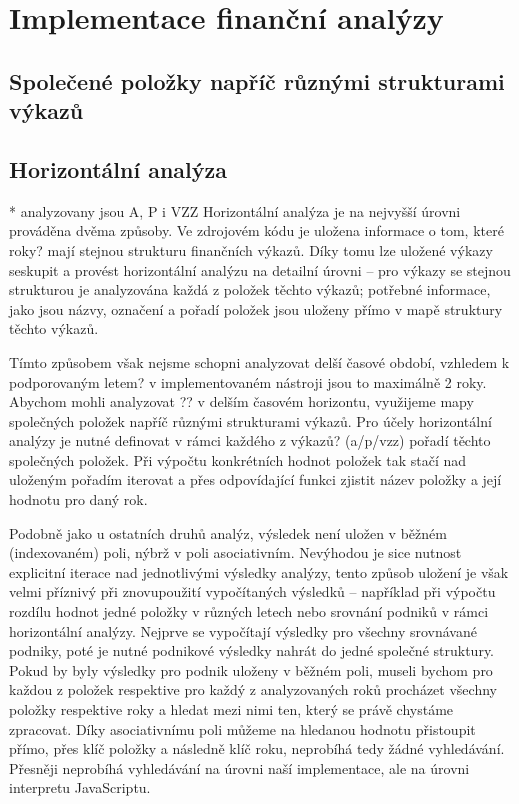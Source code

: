 \section{Implementace finanční analýzy}

\subsection{Společené položky napříč různými strukturami výkazů}


\subsection{Horizontální analýza}
* analyzovany jsou A, P i VZZ
Horizontální analýza je na nejvyšší úrovni prováděna dvěma způsoby. Ve zdrojovém kódu je uložena informace o tom, které roky? mají stejnou strukturu finančních výkazů. Díky tomu lze uložené výkazy seskupit a provést horizontální analýzu na detailní úrovni -- pro výkazy se stejnou strukturou je analyzována každá z položek těchto výkazů; potřebné informace, jako jsou názvy, označení a pořadí položek jsou uloženy přímo v mapě struktury těchto výkazů.

Tímto způsobem však nejsme schopni analyzovat delší časové období, vzhledem k podporovaným letem? v implementovaném nástroji jsou to maximálně 2 roky. Abychom mohli analyzovat ?? v delším časovém horizontu, využijeme mapy společných položek napříč různými strukturami výkazů. Pro účely horizontální analýzy je nutné definovat v rámci každého z výkazů? (a/p/vzz) pořadí těchto společných položek. Při výpočtu konkrétních hodnot položek tak stačí nad uloženým pořadím iterovat a přes odpovídající funkci zjistit název položky a její hodnotu pro daný rok.



Podobně jako u ostatních druhů analýz, výsledek není uložen v běžném (indexovaném) poli, nýbrž v poli asociativním. Nevýhodou je sice nutnost explicitní iterace nad jednotlivými výsledky analýzy, tento způsob uložení je však velmi příznivý při znovupoužití vypočítaných výsledků -- například při výpočtu rozdílu hodnot jedné položky v různých letech nebo srovnání podniků v rámci horizontální analýzy. Nejprve se vypočítají výsledky pro všechny srovnávané podniky, poté je nutné podnikové výsledky nahrát do jedné společné struktury. Pokud by byly výsledky pro podnik uloženy v běžném poli, museli bychom pro každou z položek respektive pro každý z analyzovaných roků procházet všechny položky respektive roky a hledat mezi nimi ten, který se právě chystáme zpracovat. Díky asociativnímu poli můžeme na hledanou hodnotu přistoupit přímo, přes klíč položky a následně klíč roku, neprobíhá tedy žádné vyhledávání. Přesněji neprobíhá vyhledávání na úrovni naší implementace, ale na úrovni interpretu JavaScriptu.


